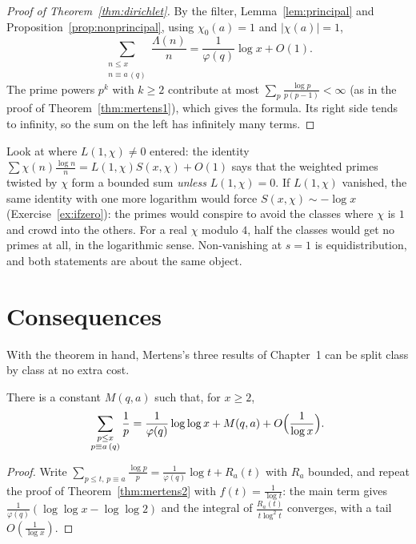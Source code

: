 \begin{proof}[Proof of Theorem~\ref{thm:dirichlet}]
By the filter, Lemma~\ref{lem:principal} and Proposition~\ref{prop:nonprincipal}, using $\chi_0(a)=1$ and $|\chi(a)|=1$,
\[
\sum_{\substack{n\le x\\n\equiv a\,(q)}}\frac{\Lambda(n)}n=\frac1{\varphi(q)}\log x+O(1).
\]
The prime powers $p^k$ with $k\ge2$ contribute at most $\sum_p\frac{\log p}{p(p-1)}<\infty$ (as in the proof of Theorem~\ref{thm:mertens1}), which gives the formula.
Its right side tends to infinity, so the sum on the left has infinitely many terms.
\end{proof}

\begin{beauty}
Look at where $L(1,\chi)\ne0$ entered: the identity $\sum\chi(n)\frac{\log n}n=L(1,\chi)S(x,\chi)+O(1)$ says that the weighted primes twisted by $\chi$ form a
bounded sum \emph{unless} $L(1,\chi)=0$. If $L(1,\chi)$ vanished, the same identity with one more logarithm would force $S(x,\chi)\sim-\log x$ (Exercise~\ref{ex:ifzero}):
the primes would conspire to avoid the classes where $\chi$ is $1$ and crowd into the others. For a real $\chi$ modulo $4$, half the classes would get
no primes at all, in the logarithmic sense. Non-vanishing at $s=1$ is equidistribution, and both statements are about the same object.
\end{beauty}

\section{Consequences}

With the theorem in hand, Mertens's three results of Chapter~1 can be split class by class at no extra cost.

\begin{corollary}\label{cor:recipprog}
There is a constant $M(q,a)$ such that, for $x\ge2$,
\[
\sum_{\substack{p\le x\\p\equiv a\,(q)}}\frac1p=\frac1{\varphi(q)}\log\log x+M(q,a)+O\Bigl(\frac1{\log x}\Bigr).
\]
\end{corollary}
\begin{proof}
Write $\sum_{p\le t,\,p\equiv a}\frac{\log p}p=\frac1{\varphi(q)}\log t+R_a(t)$ with $R_a$ bounded, and repeat the proof of Theorem~\ref{thm:mertens2} with $f(t)=\frac1{\log t}$: the main
term gives $\frac1{\varphi(q)}(\log\log x-\log\log2)$ and the integral of $\frac{R_a(t)}{t\log^2t}$ converges, with a tail $O(\frac1{\log x})$.
\end{proof}

